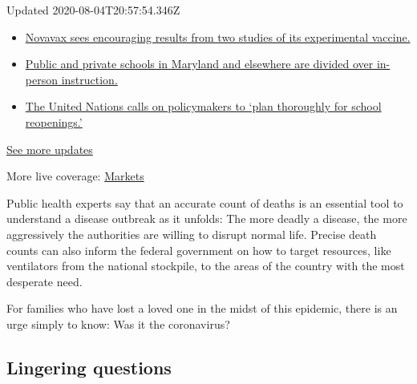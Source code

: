 Updated 2020-08-04T20:57:54.346Z

\begin{itemize}
\tightlist
\item
  \href{https://www.nytimes.com/2020/08/04/world/coronavirus-cases.html?action=click\&pgtype=Article\&state=default\&region=MAIN_CONTENT_1\&context=storylines_live_updates\#link-1228a480}{Novavax
  sees encouraging results from two studies of its experimental
  vaccine.}
\item
  \href{https://www.nytimes.com/2020/08/04/world/coronavirus-cases.html?action=click\&pgtype=Article\&state=default\&region=MAIN_CONTENT_1\&context=storylines_live_updates\#link-4825b93}{Public
  and private schools in Maryland and elsewhere are divided over
  in-person instruction.}
\item
  \href{https://www.nytimes.com/2020/08/04/world/coronavirus-cases.html?action=click\&pgtype=Article\&state=default\&region=MAIN_CONTENT_1\&context=storylines_live_updates\#link-50f7386d}{The
  United Nations calls on policymakers to `plan thoroughly for school
  reopenings.'}
\end{itemize}

\href{https://www.nytimes.com/2020/08/04/world/coronavirus-cases.html?action=click\&pgtype=Article\&state=default\&region=MAIN_CONTENT_1\&context=storylines_live_updates}{See
more updates}

More live coverage:
\href{https://www.nytimes.com/live/2020/08/04/business/stock-market-today-coronavirus?action=click\&pgtype=Article\&state=default\&region=MAIN_CONTENT_1\&context=storylines_live_updates}{Markets}

Public health experts say that an accurate count of deaths is an
essential tool to understand a disease outbreak as it unfolds: The more
deadly a disease, the more aggressively the authorities are willing to
disrupt normal life. Precise death counts can also inform the federal
government on how to target resources, like ventilators from the
national stockpile, to the areas of the country with the most desperate
need.

For families who have lost a loved one in the midst of this epidemic,
there is an urge simply to know: Was it the coronavirus?

\hypertarget{lingering-questions}{%
\subsection{Lingering questions}\label{lingering-questions}}

